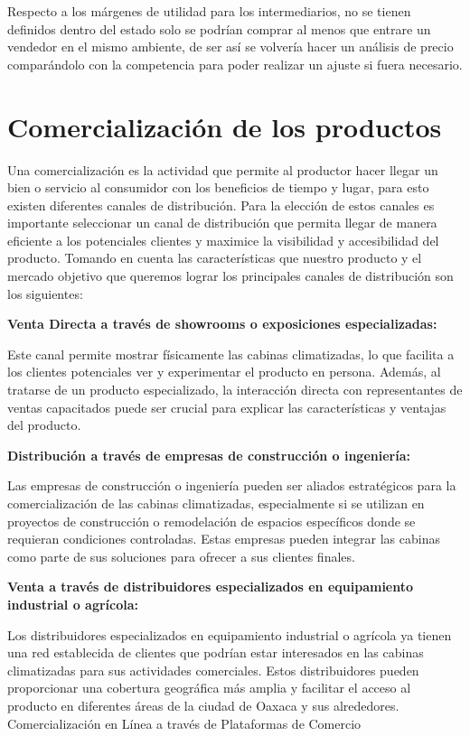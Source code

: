 Respecto a los márgenes de utilidad para los intermediarios, no se tienen definidos dentro del estado solo se podrían comprar al menos que entrare un vendedor en el mismo ambiente, de ser así se volvería hacer un análisis de precio comparándolo con la competencia para poder realizar un ajuste si fuera necesario.

\section{Comercialización de los productos }

Una comercialización es la actividad que permite al productor hacer llegar un bien o servicio al consumidor con los beneficios de tiempo y lugar, para esto existen diferentes canales de distribución. Para la elección de estos canales es importante seleccionar un canal de distribución que permita llegar de manera eficiente a los potenciales clientes y maximice la visibilidad y accesibilidad del producto. Tomando en cuenta las características que nuestro producto y el mercado objetivo que queremos lograr los principales canales de distribución son los siguientes:

\textbf{Venta Directa a través de showrooms o exposiciones especializadas:}

Este canal permite mostrar físicamente las cabinas climatizadas, lo que facilita a los clientes potenciales ver y experimentar el producto en persona. Además, al tratarse de un producto especializado, la interacción directa con representantes de ventas capacitados puede ser crucial para explicar las características y ventajas del producto.

\textbf{Distribución a través de empresas de construcción o ingeniería:}

Las empresas de construcción o ingeniería pueden ser aliados estratégicos para la comercialización de las cabinas climatizadas, especialmente si se utilizan en proyectos de construcción o remodelación de espacios específicos donde se requieran condiciones controladas. Estas empresas pueden integrar las cabinas como parte de sus soluciones para ofrecer a sus clientes finales.

\textbf{Venta a través de distribuidores especializados en equipamiento industrial o agrícola:}

Los distribuidores especializados en equipamiento industrial o agrícola ya tienen una red establecida de clientes que podrían estar interesados en las cabinas climatizadas para sus actividades comerciales. Estos distribuidores pueden proporcionar una cobertura geográfica más amplia y facilitar el acceso al producto en diferentes áreas de la ciudad de Oaxaca y sus alrededores.
Comercialización en Línea a través de Plataformas de Comercio 

